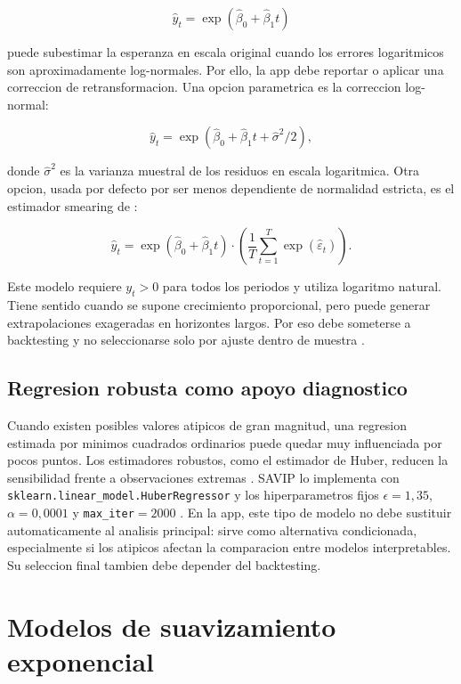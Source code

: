 ﻿\documentclass[12pt,letterpaper]{article}
\newcommand{\yhat}{\hat{y}}
\begin{document}
\[
\yhat_t=\exp(\hat{\beta}_0+\hat{\beta}_1 t)
\]

puede subestimar la esperanza en escala original cuando los errores logaritmicos son aproximadamente log-normales. Por ello, la app debe reportar o aplicar una correccion de retransformacion. Una opcion parametrica es la correccion log-normal:

\[
\yhat_t=\exp(\hat{\beta}_0+\hat{\beta}_1 t+\hat{\sigma}^2/2),
\]

donde \(\hat{\sigma}^2\) es la varianza muestral de los residuos en escala logaritmica. Otra opcion, usada por defecto por ser menos dependiente de normalidad estricta, es el estimador smearing de \citet{duan1983}:

\[
\yhat_t=\exp(\hat{\beta}_0+\hat{\beta}_1 t)\cdot
\left(\frac{1}{T}\sum_{t=1}^{T}\exp(\hat{\varepsilon}_t)\right).
\]

Este modelo requiere \(y_t>0\) para todos los periodos y utiliza logaritmo natural. Tiene sentido cuando se supone crecimiento proporcional, pero puede generar extrapolaciones exageradas en horizontes largos. Por eso debe someterse a backtesting y no seleccionarse solo por ajuste dentro de muestra \citep{penn_state_stat501,manning_mullahy2001}.

\subsection{Regresion robusta como apoyo diagnostico}

Cuando existen posibles valores atipicos de gran magnitud, una regresion estimada por minimos cuadrados ordinarios puede quedar muy influenciada por pocos puntos. Los estimadores robustos, como el estimador de Huber, reducen la sensibilidad frente a observaciones extremas \citep{huber1964,penn_state_robust_regression}. SAVIP lo implementa con \texttt{sklearn.linear\_model.HuberRegressor} y los hiperparametros fijos \(\epsilon=1{,}35\), \(\alpha=0{,}0001\) y \texttt{max\_iter}\(=2000\) \citep{sklearn_huberregressor}. En la app, este tipo de modelo no debe sustituir automaticamente al analisis principal: sirve como alternativa condicionada, especialmente si los atipicos afectan la comparacion entre modelos interpretables. Su seleccion final tambien debe depender del backtesting.

\section{Modelos de suavizamiento exponencial}
\end{document}

